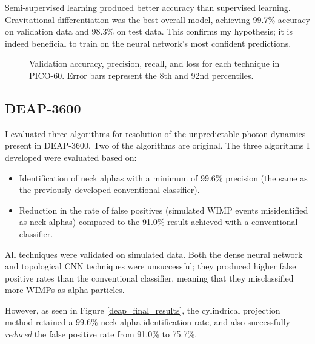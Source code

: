 \documentclass[12pt]{article}
\begin{document}
Semi-supervised learning produced better accuracy than supervised learning. Gravitational differentiation was the best overall model, achieving 99.7\% accuracy on validation data and 98.3\% on test data. This confirms my hypothesis; it is indeed beneficial to train on the neural network's most confident predictions.

\begin{figure}[ht]
    \centering
    \caption{\label{pico_final_results} Validation accuracy, precision, recall, and loss for each technique in PICO-60. Error bars represent the 8th and 92nd percentiles.}
\end{figure}

\subsection{DEAP-3600}

I evaluated three algorithms for resolution of the unpredictable photon dynamics present in DEAP-3600. Two of the algorithms are original. The three algorithms I developed were evaluated based on:

\begin{itemize}
    \item Identification of neck alphas with a minimum of 99.6\% precision (the same as the previously developed conventional classifier).
    \item Reduction in the rate of false positives (simulated WIMP events misidentified as neck alphas) compared to the 91.0\% result achieved with a conventional classifier.
\end{itemize}

All techniques were validated on simulated data. Both the dense neural network and topological CNN techniques were unsuccessful; they produced higher false positive rates than the conventional classifier, meaning that they misclassified more WIMPs as alpha particles.

However, as seen in Figure \ref{deap_final_results}, the cylindrical projection method retained a 99.6\% neck alpha identification rate, and also successfully \textit{reduced} the false positive rate from 91.0\% to 75.7\%.
\end{document}
